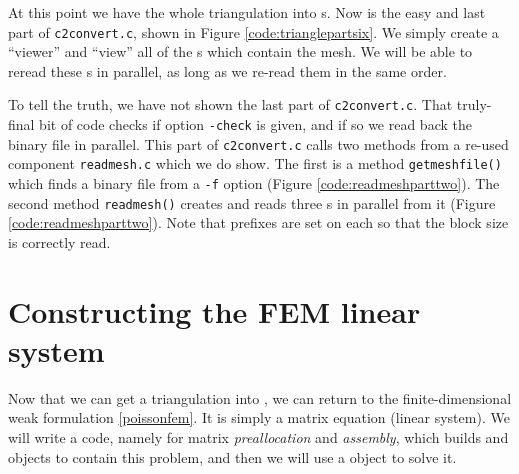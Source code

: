 At this point we have the whole triangulation into \PETSc \pVec s.  Now is the easy and last part of \texttt{c2convert.c}, shown in Figure \ref{code:trianglepartsix}.  We simply create a \PETSc ``viewer'' and ``view'' all of the \pVec s which contain the mesh.  We will be able to reread these \pVec s in parallel, as long as we re-read them in the same order.


To tell the truth, we have not shown the last part of \texttt{c2convert.c}.  That truly-final bit of code checks if option \texttt{-check} is given, and if so we read back the binary file in parallel.  This part of \texttt{c2convert.c} calls two methods from a re-used component \texttt{readmesh.c} which we do show.  The first is a method \texttt{getmeshfile()} which finds a \PETSc binary file from a \texttt{-f} option (Figure \ref{code:readmeshparttwo}).  The second method \texttt{readmesh()} creates and reads three \pVec s in parallel from it (Figure \ref{code:readmeshparttwo}).  Note that prefixes are set on each \pVec so that the block size is correctly read.




\section{Constructing the FEM linear system}

Now that we can get a triangulation into \PETSc, we can return to the finite-dimensional weak formulation \eqref{poissonfem}.  It is simply a matrix equation (linear system).  We will write a code, namely for matrix \emph{preallocation} and \emph{assembly}, which builds \PETSc \pMat and \pVec objects to contain this problem, and then we will use a \PETSc \pKSP object to solve it.

